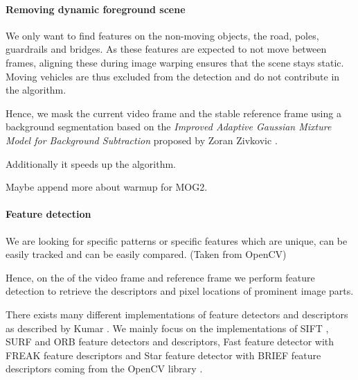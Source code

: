 
\paragraph{Removing dynamic foreground scene}
We only want to find features on the non-moving \Sc{} objects, \eg{} the road, poles, guardrails and bridges. 
As these features are expected to not move between frames, aligning these during image warping ensures that the scene stays static.
Moving vehicles are thus excluded from the detection and do not contribute in the algorithm.

Hence, we mask the current video frame and the stable reference frame using a background segmentation based on
the \emph{Improved Adaptive Gaussian Mixture Model for Background Subtraction} proposed by Zoran Zivkovic \etal{} \cite{zivkovic10.5555/1018428.1020644,zivkovic10.1016/j.patrec.2005.11.005,opencv_library}.

Additionally it speeds up the algorithm. 

Maybe append more about warmup for MOG2.

\paragraph{Feature detection}
We are looking for specific patterns or specific features which are unique, can be easily tracked and can be easily compared. (Taken from OpenCV)

Hence, on the \Sc{} of the video frame and reference frame we perform feature
detection to retrieve the descriptors and pixel locations of prominent image
parts.

There exists many different implementations of feature detectors and descriptors
as described by Kumar \etal{} \cite{kumar2014survey}. We mainly focus on the
implementations of SIFT \cite{lowe10.1023/B:VISI.0000029664.99615.94}, SURF
\cite{bay10.1007/11744023_32} and ORB \cite{rublee6126544} feature detectors and
descriptors, Fast \cite{Ghahremani_2021} feature detector with FREAK \cite{alahi6247715} feature
descriptors and Star \cite{agrawal2008censure} feature detector with BRIEF \cite{calonder10.5555/1888089.1888148} feature descriptors coming from the OpenCV library \cite{opencv_library}. 

